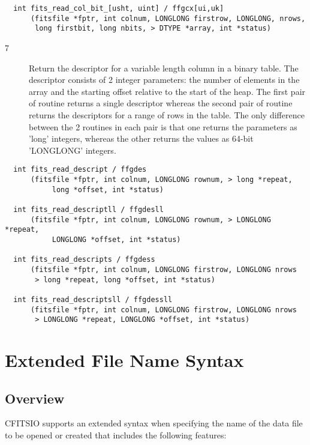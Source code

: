 \documentclass[11pt]{book}
\begin{document}
\begin{verbatim}
  int fits_read_col_bit_[usht, uint] / ffgcx[ui,uk]
      (fitsfile *fptr, int colnum, LONGLONG firstrow, LONGLONG, nrows,
       long firstbit, long nbits, > DTYPE *array, int *status)
\end{verbatim}

\begin{description}
\item[7 ] Return the descriptor for a variable length column in a binary table.
    The descriptor consists of 2 integer parameters: the number of elements
    in the array and the starting offset relative to the start of the heap.
    The first pair of routine returns a single descriptor whereas the second
    pair of routine
    returns the descriptors for a range of rows in the table.  The only
    difference between the 2 routines in each pair is that one returns
    the parameters as 'long' integers, whereas the other returns the values
    as 64-bit 'LONGLONG' integers.
   \label{ffgdes}
\end{description}

\begin{verbatim}
  int fits_read_descript / ffgdes
      (fitsfile *fptr, int colnum, LONGLONG rownum, > long *repeat,
           long *offset, int *status)

  int fits_read_descriptll / ffgdesll
      (fitsfile *fptr, int colnum, LONGLONG rownum, > LONGLONG *repeat,
           LONGLONG *offset, int *status)

  int fits_read_descripts / ffgdess
      (fitsfile *fptr, int colnum, LONGLONG firstrow, LONGLONG nrows
       > long *repeat, long *offset, int *status)

  int fits_read_descriptsll / ffgdessll
      (fitsfile *fptr, int colnum, LONGLONG firstrow, LONGLONG nrows
       > LONGLONG *repeat, LONGLONG *offset, int *status)
\end{verbatim}

\chapter{ Extended File Name Syntax }


\section{Overview}

CFITSIO supports an extended syntax when specifying the name of the
data file to be opened or created  that includes the following
features:
\end{document}
